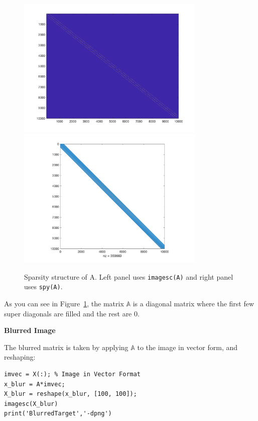 \documentclass{article}
\begin{document}
\begin{figure}[H]
\centerline{
\includegraphics[width= 9cm]{imagesc(A).png} \includegraphics[width = 9cm]{spy(A).png}
}
\caption{\label{fig:Figure 2} Sparsity structure of A. Left panel uses \texttt{imagesc(A)} and right panel uses \texttt{spy(A)}.}
\end{figure}

As you can see in Figure~\ref{fig:Figure 2}, the matrix $\mathbb A$ is a diagonal matrix where the first few super diagonals are filled and the rest are 0.

\bigskip
{\Large {\bf Blurred Image}}
\bigskip

The blurred matrix is taken by applying $\mathbb A$ to the image in vector form, and reshaping:

\begin{verbatim}
imvec = X(:); % Image in Vector Format
x_blur = A*imvec;
X_blur = reshape(x_blur, [100, 100]);
imagesc(X_blur)
print('BlurredTarget','-dpng')
\end{verbatim}
\end{document}
